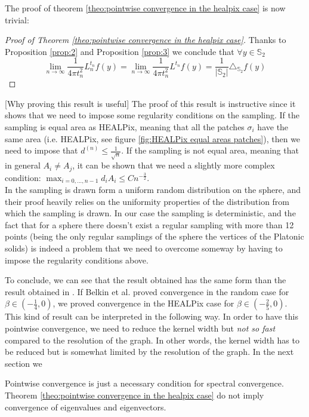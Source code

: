 The proof of theorem \ref{theo:pointwise convergence in the healpix case} is now trivial:
\begin{proof}[Proof of Theorem \ref{theo:pointwise convergence in the healpix case}]
	Thanks to Proposition \ref{prop:2} and Proposition \ref{prop:3}	we conclude that $\forall y\in\mathbb S_2 $
	$$\lim_{n\to\infty}\frac{1}{4\pi t_n^2} L_n^{t_n}f(y) =  \lim_{n\to\infty}\frac{1}{4\pi t_n^2} L^{t_n}f(y) = \frac{1}{|\mathbb S_2|}\triangle_{\mathbb S_2}f(y) $$
\end{proof}


[Why proving this result is useful] The proof of this result is instructive since it shows that we need to impose some regularity conditions on the sampling. If the sampling is equal area as HEALPix, meaning that all the patches $\sigma_i$ have the same area (i.e. HEALPix, see figure \ref{fig:HEALPix equal areas patches}), then we need to impose that $ d^{(n)}\leq \frac{1}{\sqrt{n}}$. If the sampling is not equal area, meaning that in general $A_i\neq A_j$, it can be shown that we need a slightly more complex condition: $\max_{i=0,...,n-1}d_iA_i\leq Cn^{-\frac{3}{2}}$.\\
In \cite{Belkin:2005:TTF:2138147.2138189} the sampling is drawn form a uniform random distribution on the sphere, and their proof heavily relies on the uniformity properties of the distribution from which the sampling is drawn. In our case the sampling is deterministic, and the fact that for a sphere there doesn't exist a regular sampling with more than 12 points (being the only regular samplings of the sphere the vertices of the Platonic solids) is indeed a problem that we need to overcome someway by having to impose the regularity conditions above. 


To conclude, we can see that the result obtained has the same form than the result obtained in \cite{Belkin:2005:TTF:2138147.2138189}. If Belkin et al. proved convergence in the random case for $\beta \in (-\frac{1}{4}, 0)$, we proved convergence in the HEALPix case for $\beta \in (-\frac{2}{5}, 0)$. This kind of result can be interpreted in the following way. In order to have this pointwise convergence, we need to reduce the kernel width but \textit{not so fast} compared to the resolution of the graph. In other words, the kernel width has to be reduced but is somewhat limited by the resolution of the graph. In the next section we
\begin{remark}
	Pointwise convergence is just a necessary condition for spectral convergence.  Theorem \ref{theo:pointwise convergence in the healpix case} do not imply convergence of eigenvalues and eigenvectors.
\end{remark}

